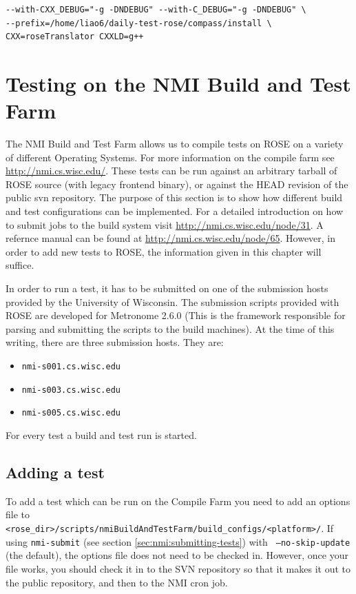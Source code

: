 \begin{verbatim}
--with-CXX_DEBUG="-g -DNDEBUG" --with-C_DEBUG="-g -DNDEBUG" \
--prefix=/home/liao6/daily-test-rose/compass/install \ 
CXX=roseTranslator CXXLD=g++
\end{verbatim}

\section{Testing on the NMI Build and Test Farm}%

The NMI Build and Test Farm allows us to compile tests on ROSE on a variety of
different Operating Systems. For more information on the compile farm see
\url{http://nmi.cs.wisc.edu/}.  These tests can be run against an arbitrary
tarball of ROSE source (with legacy frontend binary), or against the HEAD revision of the
public svn repository.  The purpose of this section is to show how different
build and test configurations can be implemented.  For a detailed introduction
on how to submit jobs to the build system visit
\url{http://nmi.cs.wisc.edu/node/31}. A refernce manual can be found at
\url{http://nmi.cs.wisc.edu/node/65}. However, in order to add new tests to
ROSE, the information given in this chapter will suffice.

In order to run a test, it has to be submitted on one of the submission hosts
provided by the University of Wisconsin.
The submission scripts provided with ROSE are developed for Metronome 2.6.0
(This is the framework responsible for parsing and submitting the scripts to the
build machines). At the time of this writing, there are three submission hosts.
They are:
\begin{itemize}
    \item {\tt nmi-s001.cs.wisc.edu}
    \item {\tt nmi-s003.cs.wisc.edu}
    \item {\tt nmi-s005.cs.wisc.edu}
\end{itemize}

For every test a build and test run is started.

\subsection{Adding a test}
To add a test which can be run on the Compile Farm you need to add an options
file to {\tt
<rose\_dir>/scripts/nmiBuildAndTestFarm/build\_configs/<platform>/}.  If using
{\tt nmi-submit} (see section \ref{sec:nmi:submitting-tests}) with {\tt
--no-skip-update} (the default), the options file does not need to be checked
in.  However, once your file works, you should check it in to the SVN repository
so that it makes it out to the public repository, and then to the NMI cron job.

